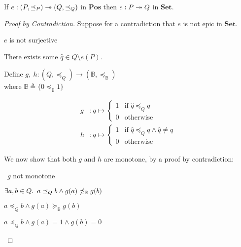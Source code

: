 \begin{lemma}\label{lemma:epic-poset-set}
  If $e : (P, \preceq_P) \twoheadrightarrow (Q, \preceq_Q)$ in $\mathbf{Pos}$ then $e : P \twoheadrightarrow Q$ in $\mathbf{Set}$.

  \begin{proof}[Proof by Contradiction]
    Suppose for a contradiction that $e$ is not epic in $\mathbf{Set}$.

    \begin{itemize}
      \step[\iffs] $e$ is not surjective

      \step[\imps] There exists some $\hat{q}\in Q\setminus e(P)$.

      \addtolength{\itemsep}{.5\baselineskip}
      \step
        Define $g,~h : (Q, \preceq_Q) \to (\mathbb{B}, \preceq_{\mathbb{B}})$\\
        where $\mathbb{B}\triangleq\{0 \preceq_{\mathbb{B}} 1\}$

        \begin{align*}
          g & : q \mapsto
          \begin{cases}
            1 & \text{if }\hat{q}\preceq_Q q\\
            0 & \text{otherwise}
          \end{cases}\\
          h & : q \mapsto
          \begin{cases}
            1 & \text{if }\hat{q}\preceq_Q q\wedge\hat{q}\neq q\\
            0 & \text{otherwise}
          \end{cases}
        \end{align*}

        We now show that both $g$ and $h$ are monotone, by a proof by contradiction:

      \addtolength{\itemsep}{-.5\baselineskip}
      \step
        \begin{itemize}
          \subp{\star}
            \Ass~$g$ not monotone
            \marginnote{\Hyp}

          \step[\imps]
            $\exists a, b\in Q\ldotp~a\preceq_Qb\wedge g(a)\npreceq_{\mathbb{B}}g(b)$

          \step[\imps]
            $a\preceq_Qb\wedge g(a)\succeq_{\mathbb{B}}g(b)$

          \step[\imps]
            $a\preceq_Qb\wedge g(a) = 1\wedge g(b) = 0$


\end{itemize}
\end{itemize}
\end{proof}
\end{lemma}

